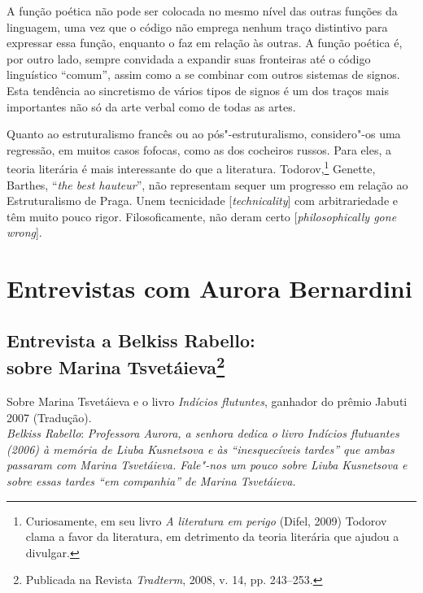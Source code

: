 A função poética não pode ser colocada no mesmo nível das outras funções
da linguagem, uma vez que o código não emprega nenhum traço distintivo
para expressar essa função, enquanto o faz em relação às outras. A
função poética é, por outro lado, sempre convidada a expandir suas
fronteiras até o código linguístico ``comum'', assim como a se combinar
com outros sistemas de signos.
Esta tendência ao sincretismo de vários tipos de signos é um
dos traços mais importantes não só da arte verbal como de todas as artes.

Quanto ao estruturalismo francês ou ao pós"-estruturalismo, considero"-os
uma regressão, em muitos casos fofocas, como as dos cocheiros russos.
Para eles, a teoria literária é mais interessante do que a literatura.
Todorov,\footnote{Curiosamente, em seu livro \emph{A literatura
em perigo} (Difel, 2009) Todorov clama a favor da literatura, em detrimento da
teoria literária que ajudou a divulgar.} Genette, Barthes, ``\emph{the best hauteur}'', não representam
sequer um progresso em relação ao Estruturalismo de Praga. Unem
tecnicidade [\emph{technicality}] com arbitrariedade e têm muito pouco
rigor. Filosoficamente, não deram certo [\emph{philosophically gone
wrong}].

\part{Entrevistas com Aurora Bernardini}

\chapter{Entrevista a Belkiss Rabello:\\
sobre Marina Tsvetáieva\footnote{Publicada na Revista
  \emph{Tradterm}, 2008, v. 14, pp. 243--253.}}
\label{rabello}

Sobre Marina Tsvetáieva e o livro \emph{Indícios flutuntes}, ganhador do
prêmio Jabuti 2007 (Tradução). \\

\noindent
\emph{Belkiss Rabello}: \emph{Professora Aurora, a senhora dedica o
livro \emph{Indícios flutuantes} (2006) à memória de Liuba Kusnetsova e
às ``inesquecíveis tardes'' que ambas passaram com Marina Tsvetáieva.
Fale"-nos um pouco sobre Liuba Kusnetsova e sobre essas tardes ``em
companhia'' de Marina Tsvetáieva.}

